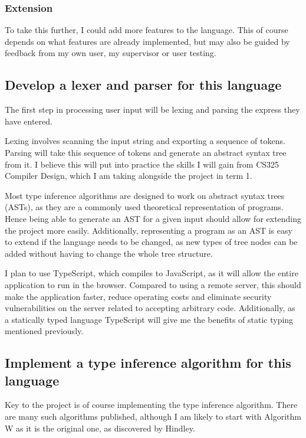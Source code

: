 \documentclass[12pt]{article}
\begin{document}
\subsubsection{Extension}

To take this further, I could add more features to the language. This of course depends on what features are already implemented, but may also be guided by feedback from my own user, my supervisor or user testing.

\subsection{Develop a lexer and parser for this language}

The first step in processing user input will be lexing and parsing the express they have entered.

Lexing involves scanning the input string and exporting a sequence of tokens. Parsing will take this sequence of tokens and generate an abstract syntax tree from it. I believe this will put into practice the skills I will gain from CS325 Compiler Design, which I am taking alongside the project in term 1.

Most type inference algorithms are designed to work on abstract syntax trees (ASTs), as they are a commonly used theoretical representation of programs. Hence being able to generate an AST for a given input should allow for extending the project more easily. Additionally, representing a program as an AST is easy to extend if the language needs to be changed, as new types of tree nodes can be added without having to change the whole tree structure.

I plan to use TypeScript, which compiles to JavaScript, as it will allow the entire application to run in the browser. Compared to using a remote server, this should make the application faster, reduce operating costs and eliminate security vulnerabilities on the server related to accepting arbitrary code. Additionally, as a statically typed language TypeScript will give me the benefits of static typing mentioned previously.

\subsection{Implement a type inference algorithm for this language}

Key to the project is of course implementing the type inference algorithm. There are many such algorithms published, although I am likely to start with Algorithm W as it is the original one, as discovered by Hindley.
\end{document}

